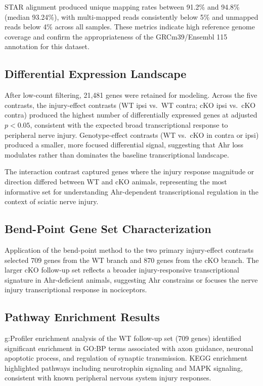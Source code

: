 \documentclass[conference]{IEEEtran}
\begin{document}
STAR alignment produced unique mapping rates between 91.2\% and 94.8\% (median 93.24\%), with multi-mapped reads consistently below 5\% and unmapped reads below 4\% across all samples. These metrics indicate high reference genome coverage and confirm the appropriateness of the GRCm39/Ensembl 115 annotation for this dataset.

\subsection{Differential Expression Landscape}

After low-count filtering, 21,481 genes were retained for modeling. Across the five contrasts, the injury-effect contrasts (WT ipsi vs.\ WT contra; cKO ipsi vs.\ cKO contra) produced the highest number of differentially expressed genes at adjusted $p < 0.05$, consistent with the expected broad transcriptional response to peripheral nerve injury. Genotype-effect contrasts (WT vs.\ cKO in contra or ipsi) produced a smaller, more focused differential signal, suggesting that Ahr loss modulates rather than dominates the baseline transcriptional landscape.

The interaction contrast captured genes where the injury response magnitude or direction differed between WT and cKO animals, representing the most informative set for understanding Ahr-dependent transcriptional regulation in the context of sciatic nerve injury.

\subsection{Bend-Point Gene Set Characterization}

Application of the bend-point method to the two primary injury-effect contrasts selected 709 genes from the WT branch and 870 genes from the cKO branch. The larger cKO follow-up set reflects a broader injury-responsive transcriptional signature in Ahr-deficient animals, suggesting Ahr constrains or focuses the nerve injury transcriptional response in nociceptors.

\subsection{Pathway Enrichment Results}

g:Profiler enrichment analysis of the WT follow-up set (709 genes) identified significant enrichment in GO:BP terms associated with axon guidance, neuronal apoptotic process, and regulation of synaptic transmission. KEGG enrichment highlighted pathways including neurotrophin signaling and MAPK signaling, consistent with known peripheral nervous system injury responses.
\end{document}
